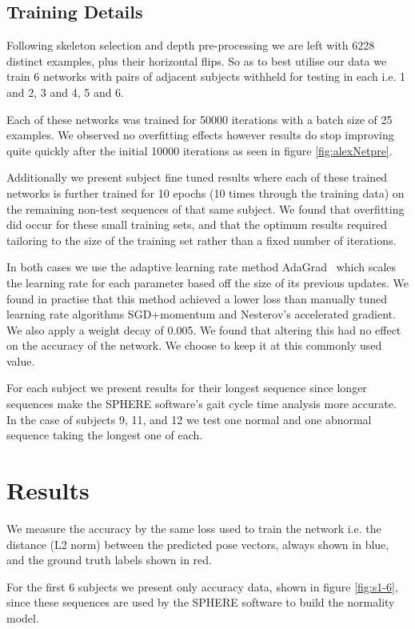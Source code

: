 \documentclass[11pt]{article} %
\begin{document}
\subsection{Training Details}


Following skeleton selection and depth pre-processing we are left with 6228 distinct examples, plus their horizontal flips. So as to best utilise our data we train 6 networks with pairs of adjacent subjects withheld for testing in each i.e. 1 and 2, 3 and 4, 5 and 6. 

Each of these networks was trained for 50000 iterations with a batch size of 25 examples. We observed no overfitting effects however results do stop improving quite quickly after the initial 10000 iterations as seen in figure \ref{fig:alexNetpre}.

Additionally we present subject fine tuned results where each of these trained networks is further trained for 10 epochs (10 times through the training data) on the remaining non-test sequences of that same subject. We found that overfitting did occur for these small training sets, and that the optimum results required tailoring to the size of the training set rather than a fixed number of iterations.

In both cases we use the adaptive learning rate method AdaGrad~\cite{Duchi2011} which scales the learning rate for each parameter based off the size of its previous updates. We found in practise that this method achieved a lower loss than manually tuned learning rate algorithms SGD+momentum and Nesterov's accelerated gradient. We also apply a weight decay of 0.005. We found that altering this had no effect on the accuracy of the network. We choose to keep it at this commonly used value.

For each subject we present results for their longest sequence since longer sequences make the SPHERE software's gait cycle time analysis more accurate. In the case of subjects 9, 11, and 12 we test one normal and one abnormal sequence taking the longest one of each. 

\section{Results}


We measure the accuracy by the same loss used to train the network i.e. the distance (L2 norm) between the predicted pose vectors, always shown in blue, and the ground truth labels shown in red. 

For the first 6 subjects we present only accuracy data, shown in figure \ref{fig:s1-6}, since these sequences are used by the SPHERE software to build the normality model.
\end{document}
